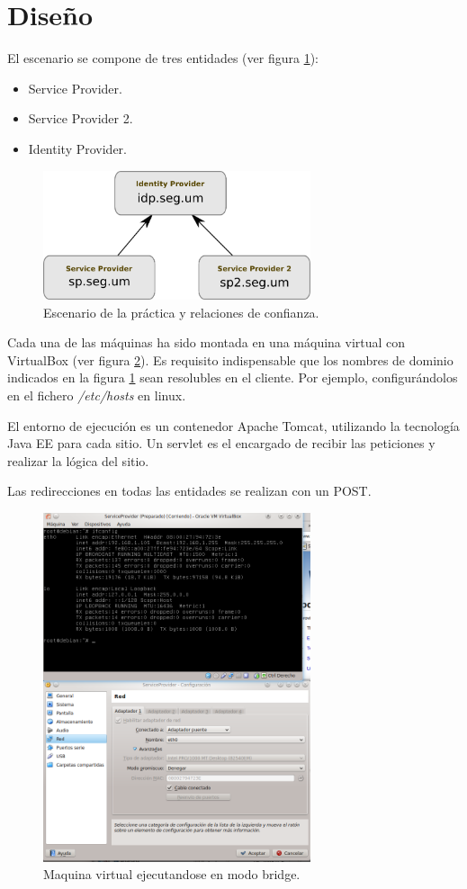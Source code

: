 \section{Diseño}

El escenario se compone de tres entidades (ver figura \ref{fig:escenario}):
\begin{itemize}
 \item Service Provider.
 \item Service Provider 2.
 \item Identity Provider.
\end{itemize}

\begin{figure}[h!]
\centering
\includegraphics[width=0.7\textwidth]{img/escenario}
\caption{Escenario de la práctica y relaciones de confianza.}
\label{fig:escenario}
\end{figure}

Cada una de las máquinas ha sido montada en una máquina virtual con VirtualBox (ver figura \ref{fig:vbox}). Es requisito indispensable que los nombres de dominio indicados en la figura \ref{fig:escenario} sean resolubles en el cliente. Por ejemplo, configurándolos en el fichero \emph{/etc/hosts} en linux.

El entorno de ejecución es un contenedor Apache Tomcat, utilizando la tecnología Java EE para cada sitio. Un servlet es el encargado de recibir las peticiones y realizar la lógica del sitio.

Las redirecciones en todas las entidades se realizan con un POST.

\begin{figure}[h!]
\centering
\includegraphics[width=0.7\textwidth]{img/maquinavirtual}
\caption{Maquina virtual ejecutandose en modo bridge.}
\label{fig:vbox}
\end{figure}